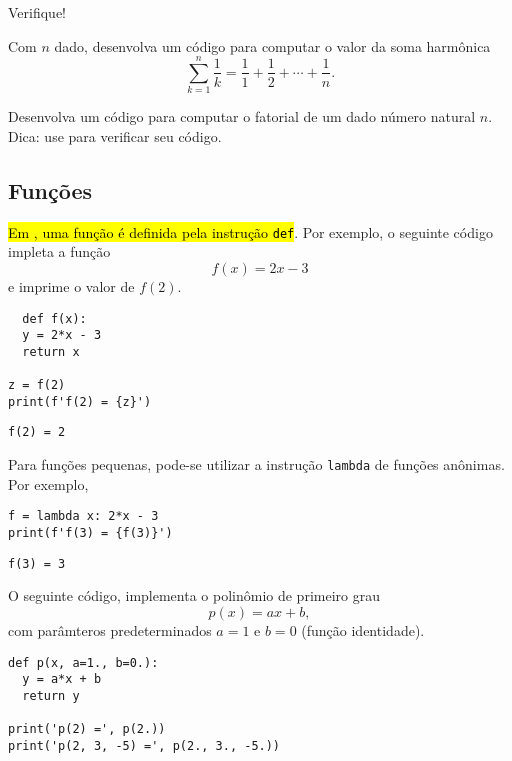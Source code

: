 Verifique!

\begin{exr}
  Com $n$ dado, desenvolva um código para computar o valor da soma harmônica
  \begin{equation}
    \sum_{k=1}^n \frac{1}{k} = \frac{1}{1} + \frac{1}{2} + \cdots + \frac{1}{n}.
  \end{equation}
\end{exr}

\begin{exr}
  Desenvolva um código para computar o fatorial de um dado número natural $n$. Dica: use {\PYTHONmathDOTfactorial} para verificar seu código.
\end{exr}

\subsection{Funções}

\hl{Em {\python}, uma função é definida pela instrução \texttt{def}}. Por exemplo, o seguinte código impleta a função
\begin{equation}
  f(x) = 2x - 3
\end{equation}
e imprime o valor de $f(2)$.

\begin{lstlisting}
  def f(x):
  y = 2*x - 3
  return x

z = f(2)
print(f'f(2) = {z}')
\end{lstlisting}

\begin{verbatim}
f(2) = 2
\end{verbatim}

\begin{obs}
  Para funções pequenas, pode-se utilizar a instrução \texttt{lambda} de funções anônimas. Por exemplo,

\begin{lstlisting}
f = lambda x: 2*x - 3
print(f'f(3) = {f(3)}')
\end{lstlisting}

\begin{verbatim}
f(3) = 3
\end{verbatim}

\end{obs}

\begin{ex}
  O seguinte código, implementa o polinômio de primeiro grau
  \begin{equation}
    p(x) = ax + b,
  \end{equation}
  com parâmteros predeterminados $a=1$ e $b=0$ (função identidade).

\begin{lstlisting}
def p(x, a=1., b=0.):
  y = a*x + b
  return y

print('p(2) =', p(2.))
print('p(2, 3, -5) =', p(2., 3., -5.))
\end{lstlisting}

\end{ex}

